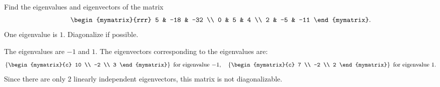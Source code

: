 \begin{ex}
  Find the eigenvalues and eigenvectors of the matrix
  \begin{equation*}
    \begin{mymatrix}{rrr}
      5 & -18 & -32 \\
      0 & 5 & 4 \\
      2 & -5 & -11
    \end{mymatrix}.
  \end{equation*}
  One eigenvalue is $1$. Diagonalize if possible.
  \begin{sol}
    The eigenvalues are $-1$ and $1$. The eigenvectors corresponding to
    the eigenvalues are:
    \begin{equation*}
      \set{\begin{mymatrix}{c}
          10 \\
          -2 \\
          3
        \end{mymatrix} } ~\mbox{for eigenvalue}~ {-1},
      \quad
      \set{\begin{mymatrix}{c}
          7 \\
          -2 \\
          2
        \end{mymatrix} } ~\mbox{for eigenvalue}~ {1}.
    \end{equation*}
    Since there are only 2 linearly independent eigenvectors, this
    matrix is not diagonalizable.
  \end{sol}
\end{ex}

